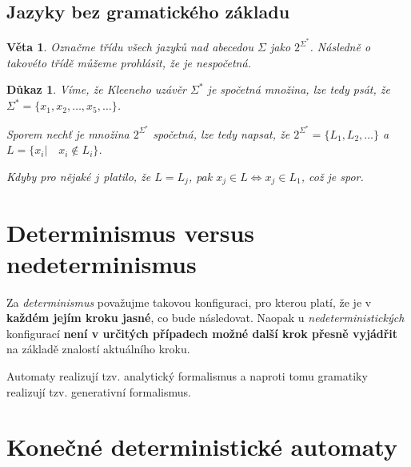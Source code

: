 \documentclass[10pt, a4paper, titlepage]{article}
\theoremstyle{note}
\newtheorem{dukaz}{Důkaz}
\newtheorem{veta}{Věta}
\begin{document}

\subsection{Jazyky bez gramatického základu}

\begin{veta}
Označme třídu všech jazyků nad abecedou $\Sigma$ jako $2^{\Sigma^{*}}$. Následně o takovéto třídě můžeme prohlásit,
že je nespočetná.
\end{veta}

\begin{dukaz}
Víme, že Kleeneho uzávěr $\Sigma^{*}$ je spočetná množina, lze tedy psát,
že $\Sigma^* = \lbrace x_1,x_2,\ldots,x_5,\ldots \rbrace$.

Sporem nechť je množina $2^{\Sigma^{*}}$ spočetná, lze tedy napsat, že $2^{\Sigma^{*}} = \lbrace L_1, L_2, \ldots \rbrace$
a $L = \lbrace x_i | \quad x_i \notin L_i \rbrace$.

Kdyby pro nějaké $j$ platilo, že $L = L_j$, pak $x_j \in L \Longleftrightarrow x_j \in L_1$, což je spor.
\end{dukaz}


\section{Determinismus versus nedeterminismus}
Za \emph{determinismus} považujme takovou konfiguraci, pro kterou platí, že je v \textbf{každém jejím kroku jasné}, co bude následovat.
Naopak u \emph{nedeterministických} konfigurací \textbf{není v určitých případech možné další krok přesně vyjádřit} na základě znalostí aktuálního kroku.

Automaty realizují tzv. analytický formalismus a naproti tomu gramatiky realizují tzv. generativní formalismus.

\section{Konečné deterministické automaty}
\end{document}
